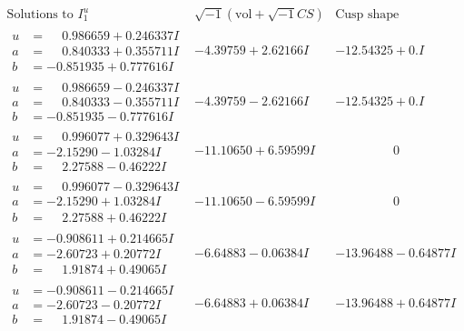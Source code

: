 \documentclass[1p]{elsarticle_modified}
\theoremstyle{definition}
\newcommand{\I}{\sqrt{-1}}
\begin{document}
$$\begin{array}{c|c|c}  
\text{Solutions to }I^u_{1}& \I (\text{vol} + \sqrt{-1}CS) & \text{Cusp shape}\\
 \hline 
\begin{aligned}
u &= \phantom{-}0.986659 + 0.246337 I \\
a &= \phantom{-}0.840333 + 0.355711 I \\
b &= -0.851935 + 0.777616 I\end{aligned}
 & -4.39759 + 2.62166 I & -12.54325 + 0. I\phantom{ +0.000000I} \\ \hline\begin{aligned}
u &= \phantom{-}0.986659 - 0.246337 I \\
a &= \phantom{-}0.840333 - 0.355711 I \\
b &= -0.851935 - 0.777616 I\end{aligned}
 & -4.39759 - 2.62166 I & -12.54325 + 0. I\phantom{ +0.000000I} \\ \hline\begin{aligned}
u &= \phantom{-}0.996077 + 0.329643 I \\
a &= -2.15290 - 1.03284 I \\
b &= \phantom{-}2.27588 - 0.46222 I\end{aligned}
 & -11.10650 + 6.59599 I & \phantom{-0.000000 } 0 \\ \hline\begin{aligned}
u &= \phantom{-}0.996077 - 0.329643 I \\
a &= -2.15290 + 1.03284 I \\
b &= \phantom{-}2.27588 + 0.46222 I\end{aligned}
 & -11.10650 - 6.59599 I & \phantom{-0.000000 } 0 \\ \hline\begin{aligned}
u &= -0.908611 + 0.214665 I \\
a &= -2.60723 + 0.20772 I \\
b &= \phantom{-}1.91874 + 0.49065 I\end{aligned}
 & -6.64883 - 0.06384 I & -13.96488 - 0.64877 I \\ \hline\begin{aligned}
u &= -0.908611 - 0.214665 I \\
a &= -2.60723 - 0.20772 I \\
b &= \phantom{-}1.91874 - 0.49065 I\end{aligned}
 & -6.64883 + 0.06384 I & -13.96488 + 0.64877 I \\ \hline\begin{aligned}

\end{aligned}
\end{array}$$
\end{document}
